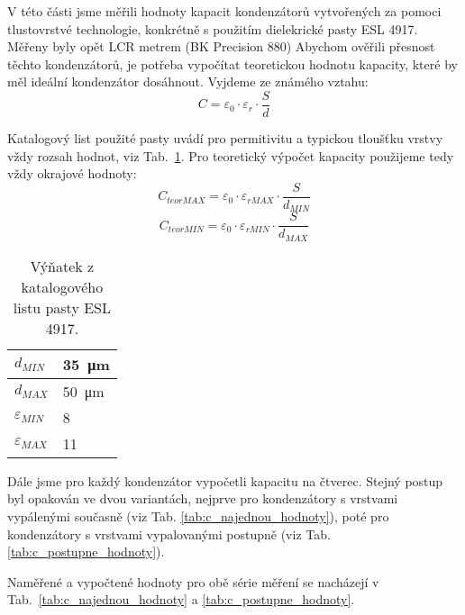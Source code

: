 V této části jsme měřili hodnoty kapacit kondenzátorů vytvořených za pomoci tlustovrstvé technologie, konkrétně s použitím dielekrické pasty ESL 4917. Měřeny byly opět LCR metrem (BK Precision 880)
Abychom ověřili přesnost těchto kondenzátorů, je potřeba vypočítat teoretickou hodnotu kapacity, které by měl ideální kondenzátor dosáhnout. Vyjdeme ze známého vztahu:
\[
    C=\varepsilon_{0}\cdot\varepsilon_{r}\cdot\frac{S}{d}
\] 




Katalogový list použité pasty \cite{pastaDatasheet} uvádí pro permitivitu a typickou tloušťku vrstvy vždy rozsah hodnot, viz Tab.~\ref{tab:pasta_hodnoty_katalog}. Pro teoretický výpočet kapacity použijeme tedy vždy okrajové hodnoty:
\[
    C_{teor MAX} = \varepsilon_{0}\cdot\varepsilon_{r MAX}\cdot\frac{S}{d_{MIN} }
\]
\[
    C_{teor MIN} = \varepsilon_{0}\cdot\varepsilon_{r MIN}\cdot\frac{S}{d_{MAX} }
\]

\begin{table}[h!]
    \caption{Výňatek z katalogového listu pasty ESL 4917.}
    \centering
    \def\arraystretch{1.4}
    \begin{tabular}{l|l}
        \(d_{MIN} \)            & \qty{35}{\micro\meter} \\ \hline
        \(d_{MAX} \)            & \qty{50}{\micro\meter} \\ \hline
        \(\varepsilon_{MIN} \)  & 8                      \\ \hline
        \(\varepsilon_{MAX} \)  & 11                     \\ 
        \end{tabular}
    \label{tab:pasta_hodnoty_katalog}
\end{table}

Dále jsme pro každý kondenzátor vypočetli kapacitu na čtverec. Stejný postup byl opakován ve dvou variantách, nejprve pro kondenzátory s vrstvami vypálenými současně (viz Tab. \ref{tab:c_najednou_hodnoty}), poté pro kondenzátory s vrstvami vypalovanými postupně (viz Tab. \ref{tab:c_postupne_hodnoty}). 

Naměřené a vypočtené hodnoty pro obě série měření se nacházejí v Tab.~\ref{tab:c_najednou_hodnoty} a \ref{tab:c_postupne_hodnoty}.

